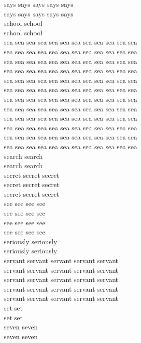 says says says says says\\
says says says says says\\
school school\\
school school\\
sea sea sea sea sea sea sea sea sea sea sea sea\\
sea sea sea sea sea sea sea sea sea sea sea sea\\
sea sea sea sea sea sea sea sea sea sea sea sea\\
sea sea sea sea sea sea sea sea sea sea sea sea\\
sea sea sea sea sea sea sea sea sea sea sea sea\\
sea sea sea sea sea sea sea sea sea sea sea sea\\
sea sea sea sea sea sea sea sea sea sea sea sea\\
sea sea sea sea sea sea sea sea sea sea sea sea\\
sea sea sea sea sea sea sea sea sea sea sea sea\\
sea sea sea sea sea sea sea sea sea sea sea sea\\
sea sea sea sea sea sea sea sea sea sea sea sea\\
sea sea sea sea sea sea sea sea sea sea sea sea\\
search search\\
search search\\
secret secret secret\\
secret secret secret\\
secret secret secret\\
see see see see\\
see see see see\\
see see see see\\
see see see see\\
seriously seriously\\
seriously seriously\\
servant servant servant servant servant\\
servant servant servant servant servant\\
servant servant servant servant servant\\
servant servant servant servant servant\\
servant servant servant servant servant\\
set set\\
set set\\
seven seven\\
seven seven\\
